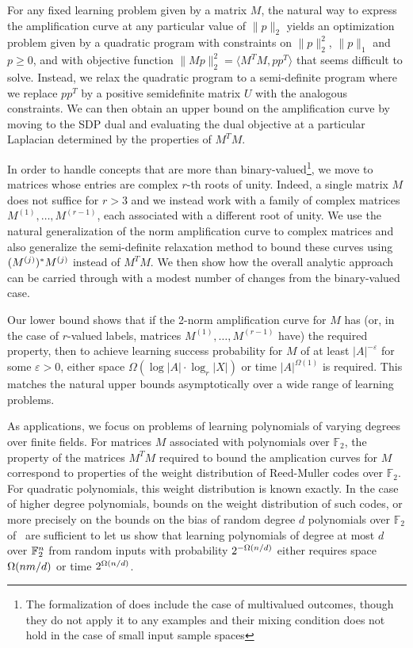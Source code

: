 For any fixed learning problem given by a matrix $M$, the natural way to
express the amplification curve at any particular value of
$\|p\|_2$ yields an optimization problem given by a quadratic program with
constraints on $\|p\|^2_2$, $\|p\|_1$ and $p\ge 0$, and with objective function
$\|Mp\|^2_2=\langle M^TM,pp^T\rangle$ that seems difficult to solve.
Instead, we relax the quadratic program to a semi-definite program where we
replace $pp^T$ by a positive semidefinite matrix $U$ with the analogous
constraints.   We can then obtain an upper
bound on the amplification curve by moving to the SDP dual and evaluating the
dual objective at a particular Laplacian determined by the properties of
$M^T M$.

In order to handle concepts that are more than binary-valued\footnote{The
formalization of \cite{DBLP:conf/colt/MoshkovitzM17,DBLP:conf/innovations/MoshkovitzM18}
does include the case of multivalued outcomes, though they do not apply it to
any examples and their mixing condition does not hold in the case of small
input sample spaces},
we move to matrices whose entries are complex $r$-th roots of unity.
Indeed, a single matrix
$M$ does not suffice for $r>3$ and we instead work with a family of complex
matrices $M^{(1)},\ldots,M^{(r-1)}$, each associated with a different
root of unity.  We use the natural generalization of the norm amplification
curve to complex matrices and also generalize the semi-definite relaxation
method to bound these curves using $(M^{(j)})^*M^{(j)}$ instead of $M^TM$. 
We then show how the overall analytic approach can be carried through with
a modest number of changes from the binary-valued case.

\begin{sloppypar}
Our lower bound shows that if the 2-norm amplification curve for $M$ has
(or, in the case of $r$-valued labels, matrices $M^{(1)},\ldots, M^{(r-1)}$ have)
the required property, then to achieve learning success probability for
$M$ of at least $|A|^{-\varepsilon}$ for
some $\varepsilon>0$, either space
$\Omega(\log |A|\cdot \log_r |X|)$ or time $|A|^{\Omega(1)}$ is required.
This matches the natural upper bounds asymptotically over a 
wide range of learning problems.
\end{sloppypar}

As applications, we focus on problems of learning
polynomials of varying degrees over finite fields.
For matrices $M$ associated with polynomials over $\mathbb{F}_2$,
the property of the matrices $M^T M$ required to bound the amplication
curves for $M$ correspond to properties of the weight distribution 
of Reed-Muller codes over $\mathbb{F}_2$.
For quadratic polynomials, this weight distribution is known
exactly.  In the case of higher degree polynomials, bounds on the weight
distribution of such codes, or more precisely on the bounds on the bias of
random degree $d$ polynomials over $\mathbb{F}_2$
of \cite{DBLP:journals/cc/Ben-EliezerHL12}~are sufficient to let us
show that learning polynomials of degree at most $d$
over $\mathbb{F}^n_2$ from random inputs with probability $2^{-\Omega(n/d)}$
either requires space $\Omega(nm/d)$ or time $2^{\Omega(n/d)}$.


